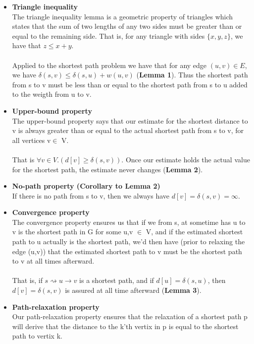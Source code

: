 \documentclass[11pt]{article}
\begin{document}
\begin{itemize}
\item \textbf{Triangle inequality}\\
The triangle inequality lemma is a geometric property of triangles which states that the sum of two lengths of any two sides must be greater than or equal to the remaining side. That is, for any triangle with sides $\{x,y,z\}$, we have that $z \leq x+y$.\\\\
Applied to the shortest path problem we have that for any edge $(u,v) \in E$, we have $\delta(s,v)\leq \delta(s,u) + w(u,v)$ (\textbf{Lemma 1}). Thus the shortest path from s to v must be less than or equal to the shortest path from s to u added to the weigth from u to v.\\
\item \textbf{Upper-bound property}\\
The upper-bound property says that our estimate for the shortest distance to v is always greater than or equal to the actual shortest path from s to v, for all vertices v$\in$ V.\\\\
That is $\forall v \in V.(d[v]\geq \delta(s,v))$. Once our estimate holds the actual value for the shortest path, the estimate never changes (\textbf{Lemma 2}).\\
\item \textbf{No-path property (\textbf{Corollary to Lemma 2})}\\
If there is no path from s to v, then we always have $d[v] = \delta(s,v) = \infty$.\\
\item \textbf{Convergence property}\\
The convergence property ensures us that if we from s, at sometime has u to v is the shortest path in G for some u,v $\in$ V, and if the estimated shortest path to u actually is the shortest path, we'd then have (prior to relaxing the edge (u,v)) that the estimated shortest path to v must be the shortest path to v at all times afterward.\\\\
That is, if $s\rightsquigarrow u\rightarrow v$ is a shortest path, and if $d[u] = \delta(s,u)$, then $d[v] = \delta(s,v)$ is assured at all time afterward (\textbf{Lemma 3}).\\
\item \textbf{Path-relaxation property}\\
Our path-relaxation property ensures that the relaxation of a shortest path p will derive that the distance to the k'th vertix in p is equal to the shortest path to vertix k.\\\\

\end{itemize}
\end{document}
